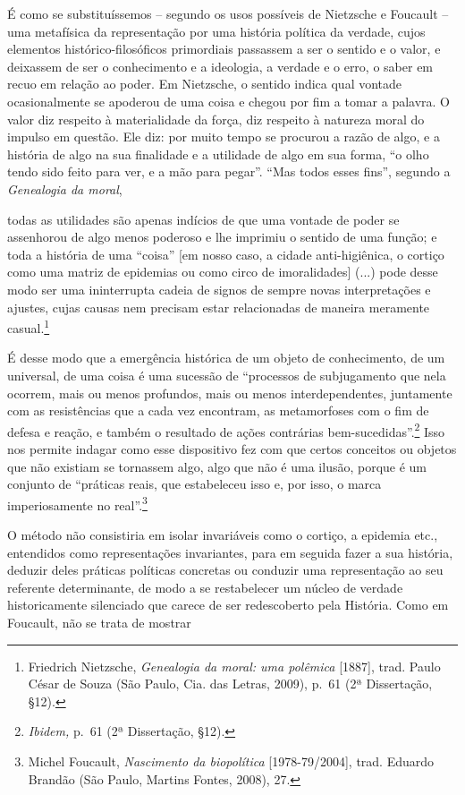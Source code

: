 É como se substituíssemos -- segundo os usos possíveis de Nietzsche e
Foucault -- uma metafísica da representação por uma história política da
verdade, cujos elementos histórico-filosóficos primordiais passassem a
ser o sentido e o valor, e deixassem de ser o conhecimento e a
ideologia, a verdade e o erro, o saber em recuo em relação ao poder. Em
Nietzsche, o sentido indica qual vontade ocasionalmente se apoderou de
uma coisa e chegou por fim a tomar a palavra. O valor diz respeito à
materialidade da força, diz respeito à natureza moral do impulso em
questão. Ele diz: por muito tempo se procurou a razão de algo, e a
história de algo na sua finalidade e a utilidade de algo em sua forma,
``o olho tendo sido feito para ver, e a mão para pegar''. ``Mas todos
esses fins'', segundo a \emph{Genealogia da moral},

todas as utilidades são apenas indícios de que uma vontade de poder se
assenhorou de algo menos poderoso e lhe imprimiu o sentido de uma
função; e toda a história de uma ``coisa'' {[}em nosso caso, a cidade
anti-higiênica, o cortiço como uma matriz de epidemias ou como circo de
imoralidades{]} (...) pode desse modo ser uma ininterrupta cadeia de
signos de sempre novas interpretações e ajustes, cujas causas nem
precisam estar relacionadas de maneira meramente casual.\footnote{Friedrich
  Nietzsche, \emph{Genealogia da moral: uma polêmica} {[}1887{]}, trad.
  Paulo César de Souza (São Paulo, Cia. das Letras, 2009), p.~61 (2ª
  Dissertação, §12).}

É desse modo que a emergência histórica de um objeto de conhecimento, de
um universal, de uma coisa é uma sucessão de ``processos de subjugamento
que nela ocorrem, mais ou menos profundos, mais ou menos
interdependentes, juntamente com as resistências que a cada vez
encontram, as metamorfoses com o fim de defesa e reação, e também o
resultado de ações contrárias bem-sucedidas''.\footnote{\emph{Ibidem,}
  p.~61 (2ª Dissertação, §12).} Isso nos permite indagar como esse
dispositivo fez com que certos conceitos ou objetos que não existiam se
tornassem algo, algo que não é uma ilusão, porque é um conjunto de
``práticas reais, que estabeleceu isso e, por isso, o marca
imperiosamente no real''.\footnote{Michel Foucault, \emph{Nascimento da
  biopolítica} {[}1978-79/2004{]}, trad. Eduardo Brandão (São Paulo,
  Martins Fontes, 2008), 27.}

O método não consistiria em isolar invariáveis como o cortiço, a
epidemia etc., entendidos como representações invariantes, para em
seguida fazer a sua história, deduzir deles práticas políticas concretas
ou conduzir uma representação ao seu referente determinante, de modo a
se restabelecer um núcleo de verdade historicamente silenciado que
carece de ser redescoberto pela História. Como em Foucault, não se trata
de mostrar

